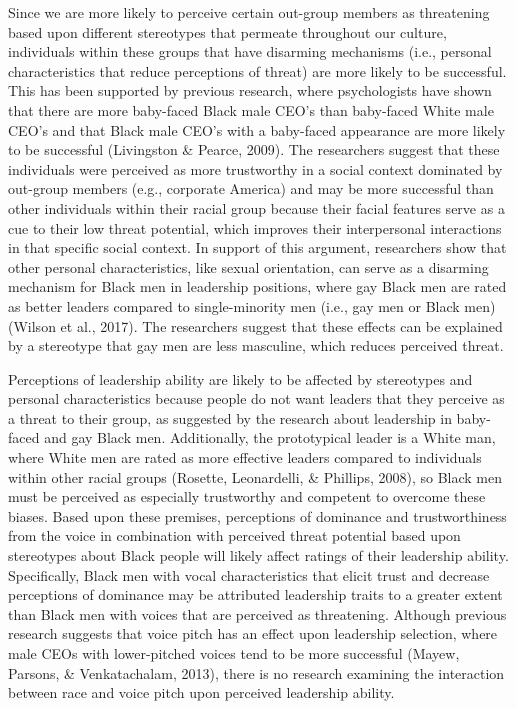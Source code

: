 \documentclass[
  english,
  man, noextraspace,floatsintext]{apa6}
\begin{document}
Since we are more likely to perceive certain out-group members as threatening based upon different stereotypes that permeate throughout our culture, individuals within these groups that have disarming mechanisms (i.e., personal characteristics that reduce perceptions of threat) are more likely to be successful. This has been supported by previous research, where psychologists have shown that there are more baby-faced Black male CEO's than baby-faced White male CEO's and that Black male CEO's with a baby-faced appearance are more likely to be successful (Livingston \& Pearce, 2009). The researchers suggest that these individuals were perceived as more trustworthy in a social context dominated by out-group members (e.g., corporate America) and may be more successful than other individuals within their racial group because their facial features serve as a cue to their low threat potential, which improves their interpersonal interactions in that specific social context. In support of this argument, researchers show that other personal characteristics, like sexual orientation, can serve as a disarming mechanism for Black men in leadership positions, where gay Black men are rated as better leaders compared to single-minority men (i.e., gay men or Black men) (Wilson et al., 2017). The researchers suggest that these effects can be explained by a stereotype that gay men are less masculine, which reduces perceived threat.

Perceptions of leadership ability are likely to be affected by stereotypes and personal characteristics because people do not want leaders that they perceive as a threat to their group, as suggested by the research about leadership in baby-faced and gay Black men. Additionally, the prototypical leader is a White man, where White men are rated as more effective leaders compared to individuals within other racial groups (Rosette, Leonardelli, \& Phillips, 2008), so Black men must be perceived as especially trustworthy and competent to overcome these biases. Based upon these premises, perceptions of dominance and trustworthiness from the voice in combination with perceived threat potential based upon stereotypes about Black people will likely affect ratings of their leadership ability. Specifically, Black men with vocal characteristics that elicit trust and decrease perceptions of dominance may be attributed leadership traits to a greater extent than Black men with voices that are perceived as threatening. Although previous research suggests that voice pitch has an effect upon leadership selection, where male CEOs with lower-pitched voices tend to be more successful (Mayew, Parsons, \& Venkatachalam, 2013), there is no research examining the interaction between race and voice pitch upon perceived leadership ability.
\end{document}
